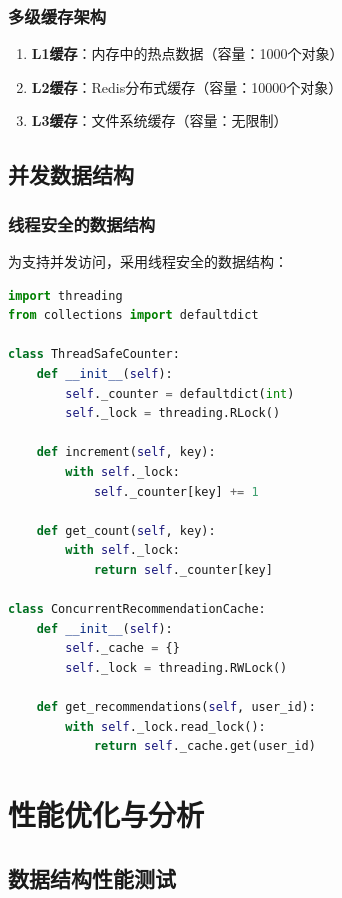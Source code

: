 \documentclass[12pt,a4paper]{article}
\begin{document}
\subsubsection{多级缓存架构}
\begin{enumerate}
    \item \textbf{L1缓存}：内存中的热点数据（容量：1000个对象）
    \item \textbf{L2缓存}：Redis分布式缓存（容量：10000个对象）
    \item \textbf{L3缓存}：文件系统缓存（容量：无限制）
\end{enumerate}

\subsection{并发数据结构}

\subsubsection{线程安全的数据结构}
为支持并发访问，采用线程安全的数据结构：

\begin{lstlisting}[language=python, caption={线程安全的共享数据结构}]
import threading
from collections import defaultdict

class ThreadSafeCounter:
    def __init__(self):
        self._counter = defaultdict(int)
        self._lock = threading.RLock()
        
    def increment(self, key):
        with self._lock:
            self._counter[key] += 1
            
    def get_count(self, key):
        with self._lock:
            return self._counter[key]

class ConcurrentRecommendationCache:
    def __init__(self):
        self._cache = {}
        self._lock = threading.RWLock()
        
    def get_recommendations(self, user_id):
        with self._lock.read_lock():
            return self._cache.get(user_id)
\end{lstlisting}

\section{性能优化与分析}

\subsection{数据结构性能测试}
\end{document}
